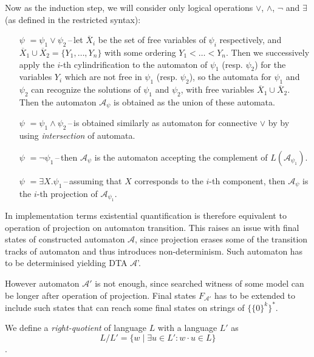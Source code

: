 Now as the induction step, we will consider only logical operations $\vee$,
$\wedge$, $\neg$ and $\exists$ (as defined in the restricted syntax):
\begin{itemize}
 \item[$\psi$]$ = \psi_1 \vee \psi_2$\,--\,let $\overline{X}_i$ be the set of
 free variables of $\psi_i$ respectively, and $\overline{X}_1 \cup
 \overline{X}_2 = \{Y_1,\ldots,Y_n\}$ with some ordering $Y_1 < \ldots < Y_n$.
 Then we successively apply the $i$-th cylindrification to the automaton of
 $\psi_1$ (resp. $\psi_2$) for the variables $Y_i$ which are not free in
 $\psi_1$ (resp. $\psi_2$), so the automata for $\psi_1$ and $\psi_2$ can
 recognize the solutions of $\psi_1$ and $\psi_2$, with free variables
 $\overline{X}_1 \cup \overline{X}_2$. Then the automaton $\mathcal{A}_\psi$ is
 obtained as the union of these automata.
 \item[$\psi$]$ = \psi_1 \wedge \psi_2$\,--\,is obtained similarly as automaton
 for connective $\vee$ by by using \emph{intersection} of automata.
 \item[$\psi$]$ = \neg\psi_1$\,--\,then $\mathcal{A}_\psi$ is the automaton
 accepting the complement of $L(\mathcal{A}_{\psi_1})$.
 \item[$\psi$]$ = \exists X.\psi_1$\,--\,assuming that $X$ corresponds to the
 $i$-th component, then $\mathcal{A}_\psi$ is the $i$-th projection of
 $\mathcal{A}_{\psi_1}$.
\end{itemize}

In implementation terms existential quantification is therefore equivalent to
operation of projection on automaton transition. This raises an issue with final
states of constructed automaton $\mathcal{A}$, since projection erases some of
the transition tracks of automaton and thus introduces non-determinism. Such automaton has to
be determinised yielding DTA $\mathcal{A}$'.

However automaton $\mathcal{A}'$ is not enough, since searched witness of some
model can be longer after operation of projection. Final states
$F_{\mathcal{A}'}$ has to be extended to include such states that can reach some
final states on strings of $\{\{0\}^k\}^*$. 

\begin{defz}
We define a \emph{right-quotient} of language $L$ with a language $L'$ as
\begin{equation}
 L / L' = \{w \mid \exists u \in L' : w\cdot u \in L\}
\end{equation}.
\end{defz}

